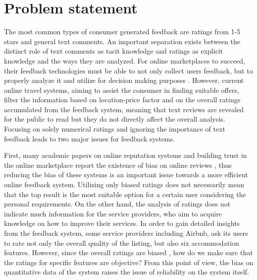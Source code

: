\section{Problem statement}
%
The most common types of consumer generated feedback are ratings from 1-5 stars and general text comments. An important separation exists between the distinct role of text comments as tacit knowledge and ratings as explicit knowledge and the ways they are analyzed. For online marketplaces to succeed, their feedback technologies must be able to not only collect users feedback, but to properly analyze it and utilize for decision making purposes \cite{pavlou2006nature}. However, current online travel systems, aiming to assist the consumer in finding suitable offers, filter the information based on location-price factor and on the overall ratings accumulated from the feedback system, meaning that text reviews are revealed for the public to read but they do not directly affect the overall analysis. Focusing on solely numerical ratings and ignoring the importance of text feedback leads to two major issues for feedback systems. 
%
%

First, many academic papers on online reputation systems and building trust in the online marketplace report the existence of bias on online reviews \cite{bolton2013engineering,dellarocas2008sound,dini2009buying,fradkin2016bias,ghose2011estimating,resnick2006value},
 thus reducing the bias of these systems is an important issue towards a more efficient online feedback system. Utilizing only biased ratings does not necessarily mean that the top result is the most suitable option for a certain user considering the personal requirements. On the other hand, the analysis of ratings does not indicate much information for the service providers, who aim to acquire knowledge on how to improve their services. In order to gain detailed insights from the feedback system, some service providers including Airbnb, ask its users to rate not only the overall quality of the listing, but also six accommodation features. However, since the overall ratings are biased \cite{fradkin2016bias}, how do we make sure that the ratings for specific features are objective? From this point of view, the bias on quantitative data of the system raises the issue of reliability on the system itself.

